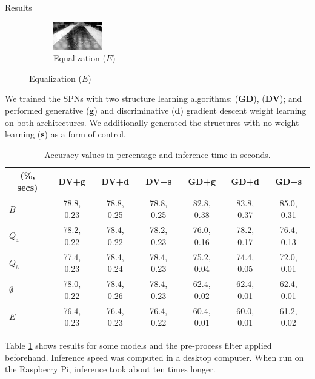 \documentclass[final,hyperref={pdfpagelabels=false},notheorems]{beamer}
\theoremstyle{thesisstyle}
\newcommand{\pskip}{\vskip 0.5cm}
\begin{document}
\begin{frame}[t]
\begin{columns}[t]
\begin{column}{.5\textwidth}
\begin{block}{Results}
\begin{figure}
\begin{subfigure}{0.3\linewidth}
          \centering\includegraphics[width=\textwidth]{imgs/eq_up.png}
          \captionsetup{justification=centering}
          \caption*{Equalization ($E$)}
        \end{subfigure}
      \end{figure}\pskip
      We trained the SPNs with two structure learning algorithms: \cite{gens-domingos}
      (\textbf{GD}), \cite{clustering} (\textbf{DV}); and performed generative (\textbf{g}) and
      discriminative (\textbf{d}) gradient descent weight learning on both architectures. We
      additionally generated the structures with no weight learning (\textbf{s}) as a form of
      control.\pskip
      \begin{table}[h]
        \centering
        \begin{tabular}{l|c|c|c|c|c|c}
          \hline
          \multicolumn{1}{c}{\bfseries (\%, secs)} & \multicolumn{1}{c}{\bfseries DV+g} &
          \multicolumn{1}{c}{\bfseries DV+d} & \multicolumn{1}{c}{\bfseries DV+s} &
          \multicolumn{1}{c}{\bfseries GD+g} & \multicolumn{1}{c}{\bfseries GD+d} &
          \multicolumn{1}{c}{\bfseries GD+s}\\
          \hline
          $B$         & 78.8, 0.23 & 78.8, 0.25 & 78.8, 0.25 & 82.8, 0.38 & 83.8, 0.37 & 85.0, 0.31\\
          $Q_4$       & 78.2, 0.22 & 78.4, 0.22 & 78.2, 0.23 & 76.0, 0.16 & 78.2, 0.17 & 76.4, 0.13\\
          $Q_6$       & 77.4, 0.23 & 78.4, 0.24 & 78.4, 0.23 & 75.2, 0.04 & 74.4, 0.05 & 72.0, 0.01\\
          $\emptyset$ & 78.0, 0.22 & 78.4, 0.26 & 78.4, 0.23 & 62.4, 0.02 & 62.4, 0.01 & 62.4, 0.01\\
          $E$         & 76.4, 0.23 & 76.4, 0.23 & 76.4, 0.22 & 60.4, 0.01 & 60.0, 0.01 & 61.2, 0.02\\
        \end{tabular}
        \caption{Accuracy values in percentage and inference time in seconds.\label{tab:accuracy}}
      \end{table}
      Table \ref{tab:accuracy} shows results for some models and the pre-process filter applied
      beforehand. Inference speed was computed in a desktop computer. When run on the Raspberry Pi,
      inference took about ten times longer.\pskip


\end{block}
\end{column}
\end{columns}
\end{frame}
\end{document}
